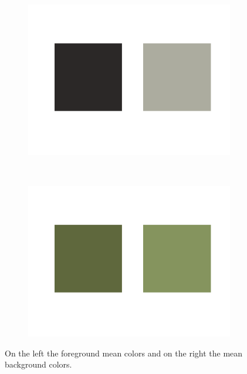 \documentclass{paper}
\begin{document}
\begin{figure}[H]
    \centering
    \begin{subfigure}{0.45\textwidth}
        \includegraphics[width=\textwidth]{../../outputs/p4/image_segmentation/zebra/gamma20/mean_fg}
    \end{subfigure}
    ~
        \begin{subfigure}{0.45\textwidth}
        \includegraphics[width=\textwidth]{../../outputs/p4/image_segmentation/zebra/gamma20/mean_bg}
    \end{subfigure}
    
    \caption{On the left the foreground mean colors and on the right the mean background colors.}
    \label{fig:segmentation_zebra_mean_colors}       
\end{figure}
\end{document}

